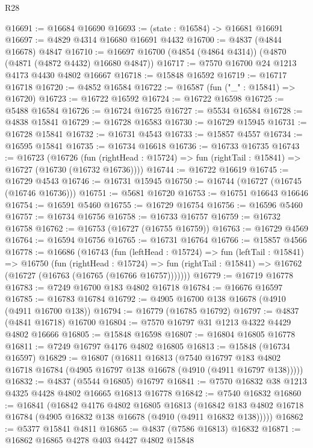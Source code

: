 \begin{lexlean}{R28}
\begin{coremodule}
@16691 := @16684 @16690
@16693 := (state : @16584) -> @16681 @16691
@16697 := @4829 @4314 @16680 @16691 @4432
@16700 := @4837 (@4844 @16678) @4847
@16710 := @16697 @16700 (@4854 (@4864 @4314)) (@4870 (@4871 (@4872 @4432) @16680 @4847))
@16717 := @7570 @16700 @24 @1213 @4173 @4430 @4802 @16667
@16718 := @15848 @16592
@16719 := @16717 @16718
@16720 := @4852 @16584
@16722 := @16587 (fun ("_" : @15841) => @16720)
@16723 := @16722 @16592
@16724 := @16722 @16598
@16725 := @5488 @16584
@16726 := @16724 @16725
@16727 := @5534 @16584
@16728 := @4838 @15841
@16729 := @16728 @16583
@16730 := @16729 @15945
@16731 := @16728 @15841
@16732 := @16731 @4543
@16733 := @15857 @4557
@16734 := @16595 @15841
@16735 := @16734 @16618
@16736 := @16733 @16735
@16743 := @16723
    (@16726
      (fun (rightHead : @15724) => fun (rightTail : @15841) => @16727 (@16730 (@16732 @16736))))
@16744 := @16722 @16619
@16745 := @16729 @4543
@16746 := @16731 @15945
@16750 := @16744 (@16727 (@16745 (@16746 @16736)))
@16751 := @5681 @16720
@16753 := @16751 @16643 @16646
@16754 := @16591 @5460
@16755 := @16729 @16754
@16756 := @16596 @5460
@16757 := @16734 @16756
@16758 := @16733 @16757
@16759 := @16732 @16758
@16762 := @16753 (@16727 (@16755 @16759))
@16763 := @16729 @4569
@16764 := @16594 @16756
@16765 := @16731 @16764
@16766 := @15857 @4566
@16778 := @16686
    (@16743
      (fun (leftHead : @15724) =>
      fun (leftTail : @15841) =>
      @16750
        (fun (rightHead : @15724) =>
        fun (rightTail : @15841) => @16762 (@16727 (@16763 (@16765 (@16766 @16757)))))))
@16779 := @16719 @16778
@16783 := @7249 @16700 @183 @4802 @16718
@16784 := @16676 @16597
@16785 := @16783 @16784
@16792 := @4905 @16700 @138 @16678 (@4910 (@4911 @16700 @138))
@16794 := @16779 (@16785 @16792)
@16797 := @4837 (@4841 @16718) @16700
@16804 := @7570 @16797 @31 @1213 @4322 @4429 @4802 @16666
@16805 := @15848 @16598
@16807 := @16804 @16805 @16778
@16811 := @7249 @16797 @4176 @4802 @16805
@16813 := @15848 (@16734 @16597)
@16829 := @16807
    (@16811
      @16813
      (@7540
        @16797
        @183
        @4802
        @16718
        @16784
        (@4905 @16797 @138 @16678 (@4910 (@4911 @16797 @138)))))
@16832 := @4837 (@5544 @16805) @16797
@16841 := @7570 @16832 @38 @1213 @4325 @4428 @4802 @16665 @16813 @16778
@16842 := @7540 @16832
@16860 := @16841
    (@16842
      @4176
      @4802
      @16805
      @16813
      (@16842 @183 @4802 @16718 @16784 (@4905 @16832 @138 @16678 (@4910 (@4911 @16832 @138)))))
@16862 := @5377 @15841 @4811
@16865 := @4837 (@7586 @16813) @16832
@16871 := @16862 @16865 @4278 @403 @4427 @4802 @15848

\end{coremodule}
\end{lexlean}
